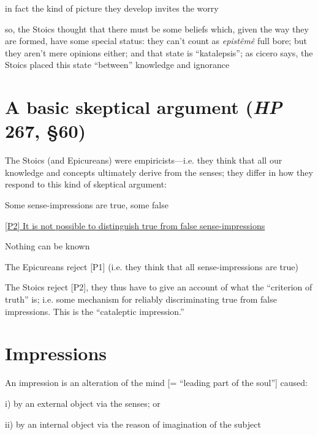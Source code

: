 \documentclass[11pt]{article}
\begin{document}
\noindent in fact the kind of picture they develop invites the worry
\vspace*{2mm}

\noindent so, the Stoics thought that there must be some beliefs which, given the way they are formed, have some special status: they can't count as \emph{epist\^{e}m\^{e}} full bore; but they aren't mere opinions either; and that state is ``katalepsis''; as cicero says, the Stoics placed this state ``between'' knowledge and ignorance


\section*{A basic skeptical argument (\emph{HP} 267, \S60)}

\noindent The Stoics (and Epicureans) were empiricists---i.e. they think that all our knowledge and concepts ultimately derive from the senses; they differ in how they respond to this kind of skeptical argument:
\vspace*{2mm}

\noindent [P1] Some sense-impressions are true, some false
\vspace*{1mm}

\noindent\underline{[P2] It is not possible to distinguish true from false sense-impressions}
\vspace*{1mm}

\noindent [C] Nothing can be known
\vspace*{2mm}

\noindent The Epicureans reject [P1] (i.e. they think that all sense-impressions are true)
\vspace*{2mm}

\noindent The Stoics reject [P2], they thus have to give an account of what the ``criterion of truth'' is; i.e. some mechanism for reliably discriminating true from false impressions. This is the ``cataleptic impression.''

\section*{Impressions}

\noindent An impression is an alteration of the mind [= ``leading part of the soul''] caused:
\vspace*{2mm}

i) by an external object via the senses; or
\vspace*{1mm}

ii) by an internal object via the reason of imagination of the subject
\vspace*{2mm}
\end{document}
